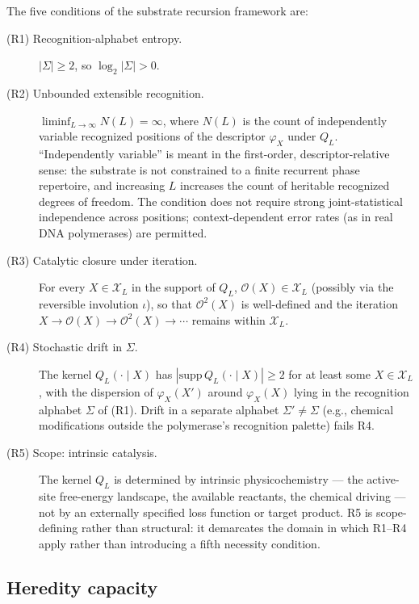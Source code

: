 \documentclass[11pt]{article}
\theoremstyle{plain}
\theoremstyle{definition}
\newcommand{\descX}{\varphi_X}
\newcommand{\Xset}{\mathcal{X}}
\newcommand{\Op}{\mathcal{O}}
\begin{document}
The five conditions of the substrate recursion framework are:

\begin{description}
\item[(R1) Recognition-alphabet entropy.] $|\Sigma| \ge 2$, so $\log_2 |\Sigma| > 0$.

\item[(R2) Unbounded extensible recognition.] $\liminf_{L \to \infty} N(L) = \infty$, where $N(L)$ is the count of independently variable recognized positions of the descriptor $\descX$ under $Q_L$. ``Independently variable'' is meant in the first-order, descriptor-relative sense: the substrate is not constrained to a finite recurrent phase repertoire, and increasing $L$ increases the count of heritable recognized degrees of freedom. The condition does not require strong joint-statistical independence across positions; context-dependent error rates (as in real DNA polymerases) are permitted.

\item[(R3) Catalytic closure under iteration.] For every $X \in \Xset_L$ in the support of $Q_L$, $\Op(X) \in \Xset_L$ (possibly via the reversible involution $\iota$), so that $\Op^2(X)$ is well-defined and the iteration $X \to \Op(X) \to \Op^2(X) \to \cdots$ remains within $\Xset_L$.

\item[(R4) Stochastic drift in $\Sigma$.] The kernel $Q_L(\cdot \mid X)$ has $|\mathrm{supp}\, Q_L(\cdot \mid X)| \ge 2$ for at least some $X \in \Xset_L$, with the dispersion of $\descX(X')$ around $\descX(X)$ lying in the recognition alphabet $\Sigma$ of (R1). Drift in a separate alphabet $\Sigma' \ne \Sigma$ (e.g., chemical modifications outside the polymerase's recognition palette) fails R4.

\item[(R5) Scope: intrinsic catalysis.] The kernel $Q_L$ is determined by intrinsic physicochemistry --- the active-site free-energy landscape, the available reactants, the chemical driving --- not by an externally specified loss function or target product. R5 is scope-defining rather than structural: it demarcates the domain in which R1--R4 apply rather than introducing a fifth necessity condition.
\end{description}

\subsection{Heredity capacity}
\label{subsec:capacity_def}
\end{document}
